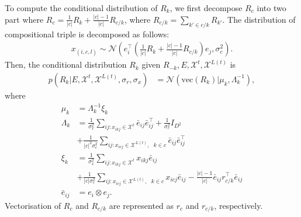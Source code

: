 To compute the conditional distribution of $R_k$, we first decompose $R_c$ into two part where $R_c =
\frac{1}{|c|} R_k + \frac{|c|-1}{|c|}R_{c/k}$, where $R_{c/k} = \sum_{k' \in c/k} R_{k'}$.
The distribution of compositional triple is decomposed as follows:
\begin{align}
x_{(i, c, l)} \sim \mathcal{N}(e_i^\top (\frac{1}{|c|} R_k + \frac{|c|-1}{|c|}R_{c/k}) e_j, \sigma_{c}^2).
\end{align}
Then, the conditional distribution $R_k$ given $R_{-k}, E, \mathcal{X}^{t}, \mathcal{X}^{L(t)}$ is
\begin{align}
\label{eqn:comp_cond_r}
p(R_k|E, \mathcal{X}^{t}, \mathcal{X}^{L(t)}, \sigma_r, \sigma_x)  &= \mathcal{N}(\text{vec}(R_k) | \mu_k,
\Lambda_k^{-1}),
\end{align}
where
\begin{align*}
\mu_k &=\Lambda_k^{-1}\xi_k \\
\Lambda_k &= \frac{1}{\sigma_x^2} \sum_{ij:x_{ikj} \in \mathcal{X}^{t}} \bar{e}_{ij}\bar{e}_{ij}^\top + \frac{1}
{\sigma_r^2} {I}_{D^2} \\
& +\frac{1}{|c|^2 \sigma_c^2} \sum_{ij:x_{icj} \in \mathcal{X}^{L(t)},\text{ }k \in c} \bar{e}_{ij} \bar{e}_{ij}^\top \\
\xi_k &=  \frac{1}{\sigma_x^2}\sum_{ij:x_{ikj} \in \mathcal{X}^{t}} x_{ikj} \bar{e}_{ij}\\
& +\frac{1}{|c| \sigma_c^2} \sum_{ij:x_{icj} \in \mathcal{X}^{L(t)},\text{ }k \in c} x_{icj} \bar{e}_{ij} - \frac{|c|-1}{|c|}
\bar{e}_{ij} r_{c/k}^\top \bar{e}_{ij}\\
\bar{e}_{ij} &= e_{i} \otimes e_{j}.
\end{align*}
Vectorisation of $R_c$ and $R_{c/k}$ are represented as $r_c$ and $r_{c/k}$, respectively.

